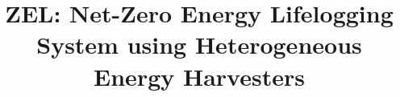 \documentclass[conference]{IEEEtran}
\begin{document}




\title{ZEL: Net-Zero Energy Lifelogging System using Heterogeneous Energy Harvesters}

\author{
\IEEEauthorblockA{
}
}


\maketitle
\end{document}
